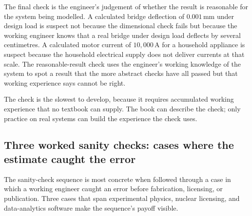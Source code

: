 The final check is the engineer's judgement of whether the result is
reasonable for the system being modelled. A calculated bridge
deflection of $0.001 \,\si{\milli\meter}$ under design load is
suspect not because the dimensional check fails but because the
working engineer knows that a real bridge under design load deflects
by several centimetres. A calculated motor current of
$10{,}000 \,\si{\ampere}$ for a household appliance is suspect
because the household electrical supply does not deliver currents at
that scale. The reasonable-result check uses the engineer's working
knowledge of the system to spot a result that the more abstract
checks have all passed but that working experience says cannot be
right.

The check is the slowest to develop, because it requires accumulated
working experience that no textbook can supply. The book can describe
the check; only practice on real systems can build the experience the
check uses.

\subsection{Three worked sanity checks: cases where the estimate caught the
error}

The sanity-check sequence is most concrete when followed through a
case in which a working engineer caught an error before fabrication,
licensing, or publication. Three cases that span experimental
physics, nuclear licensing, and data-analytics software make the
sequence's payoff visible.

